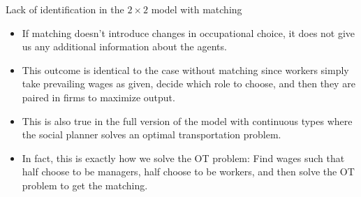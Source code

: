 \documentclass[aspectratio=169]{beamer}
\begin{document}
\begin{frame}{Lack of identification in the $2\times 2$ model with matching}
	\begin{itemize}
		\item If matching doesn't introduce changes in occupational choice, it does not give us any additional information about the agents.
		\bigskip
		\item This outcome is identical to the case without matching since workers simply take prevailing wages as given, decide which role to choose, and then they are paired in firms to maximize output.
		\bigskip
		\item This is also true in the full version of the model with continuous types where the social planner solves an optimal transportation problem.
		\bigskip
		\item In fact, this is exactly how we solve the OT problem: Find wages such that half choose to be managers, half choose to be workers, and then solve the OT problem to get the matching.

	\end{itemize}
\end{frame}
		
\end{document}

